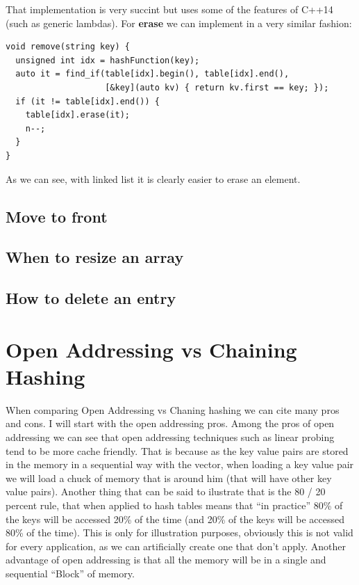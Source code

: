 That implementation is very succint but uses some of the features of C++14 (such as generic lambdas). For \textbf{erase} we can implement in a very similar fashion:

\begin{lstlisting}
void remove(string key) {
  unsigned int idx = hashFunction(key);
  auto it = find_if(table[idx].begin(), table[idx].end(),
                    [&key](auto kv) { return kv.first == key; });
  if (it != table[idx].end()) {
    table[idx].erase(it);
    n--;
  }
}
\end{lstlisting}

As we can see, with linked list it is clearly easier to erase an element. 

\subsection{Move to front}

\subsection{When to resize an array}

\subsection{How to delete an entry}

\section{Open Addressing vs Chaining Hashing}

When comparing Open Addressing vs Chaning hashing we can cite many pros and cons. I will start with the open addressing pros. Among the pros of open addressing we can see that open addressing techniques such as linear probing tend to be more cache friendly. That is because as the key value pairs are stored in the memory in a sequential way with the vector, when loading a key value pair we will load a chuck of memory that is around him (that will have other key value pairs). Another thing that can be said to ilustrate that is the 80 / 20 percent rule, that when applied to hash tables means that ``in practice'' 80\% of the keys will be accessed 20\% of the time (and 20\% of the keys will be accessed 80\% of the time). This is only for illustration purposes, obviously this is not valid for every application, as we can artificially create one that don't apply. Another advantage of open addressing is that all the memory will be in a single and sequential ``Block'' of memory. 